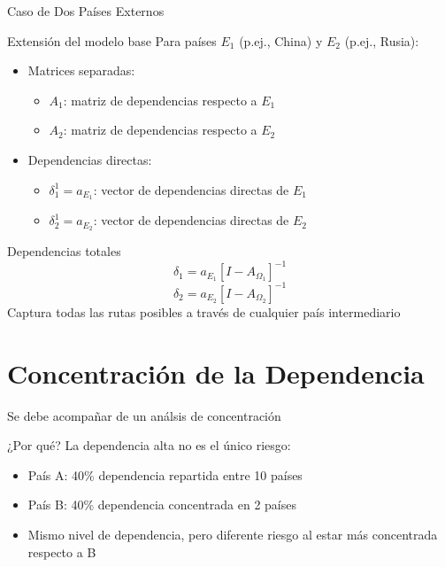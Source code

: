 \documentclass{beamer}
\begin{document}
\begin{frame}{Caso de Dos Países Externos}
    \begin{block}{Extensión del modelo base}
        Para países $E_1$ (p.ej., China) y $E_2$ (p.ej., Rusia):
        \begin{itemize}
            \item Matrices separadas:
            \begin{itemize}
                \item $A_1$: matriz de dependencias respecto a $E_1$
                \item $A_2$: matriz de dependencias respecto a $E_2$
            \end{itemize}
            \item Dependencias directas: 
            \begin{itemize}
                \item $\delta^1_1 = a_{E_1}$: vector de dependencias directas de $E_1$
                \item $\delta^1_2 = a_{E_2}$: vector de dependencias directas de $E_2$
            \end{itemize}
        \end{itemize}
    \end{block}
    
    \begin{block}{Dependencias totales}
        \[ \delta_1 = a_{E_1} [I - A_{\Omega_1}]^{-1} \]
        \[ \delta_2 = a_{E_2} [I - A_{\Omega_2}]^{-1} \]
        Captura todas las rutas posibles a través de cualquier país intermediario
    \end{block}
\end{frame}
\section{Concentración de la Dependencia}

\begin{frame}{Se debe acompañar de un análsis de concentración}
    \begin{block}{¿Por qué?}
        La dependencia alta no es el único riesgo:
        \begin{itemize}
            \item País A: 40\% dependencia repartida entre 10 países
            \item País B: 40\% dependencia concentrada en 2 países
            \item \alert{Mismo nivel de dependencia, pero diferente riesgo al estar más concentrada respecto a B}
        \end{itemize}
    \end{block}
\end{frame}
\end{document}
